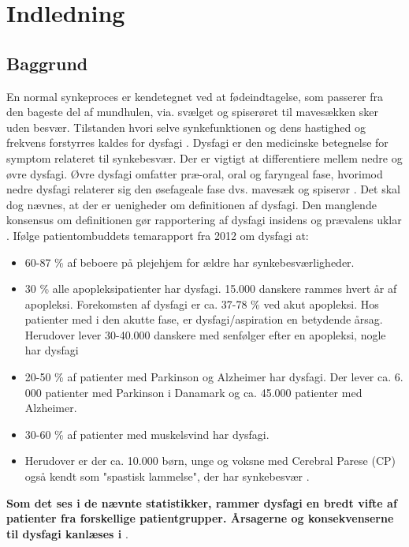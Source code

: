 \chapter{Indledning}

\section{Baggrund}
En normal synkeproces er kendetegnet ved at fødeindtagelse, som passerer fra den bageste del af mundhulen, via. svælget og spiserøret til mavesækken sker uden besvær. Tilstanden hvori selve synkefunktionen og dens hastighed og frekvens forstyrres kaldes for dysfagi \cite{Sundhedsstyrelsen2015NationalDysfagi}. Dysfagi er den medicinske betegnelse for symptom relateret til synkebesvær. Der er vigtigt at differentiere mellem nedre og øvre dysfagi. Øvre dysfagi omfatter præ-oral, oral og faryngeal fase, hvorimod nedre dysfagi relaterer sig den øsefageale fase dvs. mavesæk og spiserør \cite{KjaersgaardPh.d.studerendeDYSFAGIKonsekvenser}. Det skal dog nævnes, at der er uenigheder om definitionen af dysfagi. Den manglende konsensus om definitionen gør rapportering af dysfagi insidens og prævalens uklar \cite{KjaersgaardPh.d.studerendeDYSFAGIKonsekvenser}. Ifølge patientombuddets temarapport fra 2012 om dysfagi at:

\begin{itemize}
\item 60-87 \% af beboere på plejehjem for ældre har synkebesværligheder.
\item 30 \% alle apopleksipatienter har dysfagi. 15.000 danskere rammes hvert år af apopleksi. Forekomsten af dysfagi er ca. 37-78 \% ved akut apopleksi. Hos patienter med i den akutte fase, er dysfagi/aspiration en betydende årsag. Herudover lever 30-40.000 danskere med senfølger efter en apopleksi, nogle har dysfagi
\item 20-50 \% af patienter med Parkinson og Alzheimer har dysfagi. Der lever ca. 6. 000 patienter med Parkinson i Danamark og ca. 45.000 patienter med Alzheimer.  
\item 30-60 \% af patienter med muskelsvind har dysfagi.
\item Herudover er der ca. 10.000 børn, unge og voksne med Cerebral Parese (CP) også kendt som "spastisk lammelse", der har synkebesvær \cite{Bommersholdt2012TemarapportDysfagi}. 
\end{itemize}

\textbf{Som det ses i de nævnte statistikker, rammer dysfagi en bredt vifte af patienter fra forskellige patientgrupper. Årsagerne og konsekvenserne til dysfagi kanlæses i} . 

